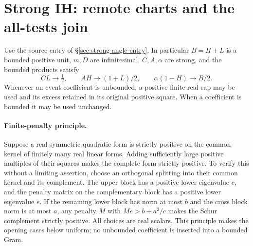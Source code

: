 \section{Strong IH: remote charts and the all-tests join}
\label{sec:strong-ih-remote}
Use the source entry of \S\ref{sec:strong-angle-entry}. In particular
$B=H+L$ is a bounded positive unit, $m,D$ are infinitesimal,
$C,A,\alpha$ are strong, and the bounded products satisfy
\[
 CL\to\tfrac12,\qquad AH\to(1+L)/2,
 \qquad\alpha(1-H)\to B/2.
\tag{SR1}
\]
Whenever an event coefficient is unbounded, a positive finite real cap
may be used and its excess retained in its original positive square.
When a coefficient is bounded it may be used unchanged.

\paragraph{Finite-penalty principle.}
Suppose a real symmetric quadratic form is strictly positive on the
common kernel of finitely many real linear forms. Adding sufficiently
large positive multiples of their squares makes the complete form
strictly positive. To verify this without a limiting assertion, choose
an orthogonal splitting into their common kernel and its complement.
The upper block has a positive lower eigenvalue $c$, and the penalty
matrix on the complementary block has a positive lower eigenvalue
$e$. If the remaining lower block has norm at most $b$ and the cross
block norm is at most $a$, any penalty $M$ with $Me>b+a^2/c$ makes the
Schur complement strictly positive. All choices are real scalars.
This principle makes the opening cases below uniform; no unbounded
coefficient is inserted into a bounded Gram.

